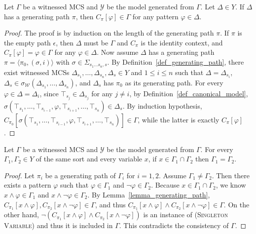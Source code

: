 \documentclass[acmsmall]{acmart}
\theoremstyle{acmdefinition}
\newcommand{\WW}{\mathcal{W}}
\newcommand{\YY}{\mathcal{Y}}
\newcommand{\sigmaW}{{\sigma_{\WW}}}
\newcommand{\prule}[1]{\textsc{(#1)}}
\newcommand{\singletonvariable}{\prule{Singleton Variable}\xspace}
\newcommand{\seq}[1]{\langle #1 \rangle} %
\newcommand{\ddd}{,\dots,}
\newcommand{\Cpi}{{C_\pi}}
\newcommand{\SigmaSub}[1]{\Sigma_{#1}}
\begin{document}
\begin{lemma}
\label{lemma_generating_path}
Let $\Gamma$ be a witnessed MCS and
$\YY$ be the model generated from $\Gamma$.
Let $\Delta \in Y$.
If $\Delta$ has a generating path $\pi$,
then
$\Cpi[\varphi] \in \Gamma$
for any pattern $\varphi \in \Delta$.
\end{lemma}
\begin{proof}
The proof is by induction on the length of the generating path $\pi$.
If $\pi$ is the empty path $\epsilon$, 
then $\Delta$ must be $\Gamma$ and $\Cpi$ is the identity 
context, and 
$\Cpi[\varphi] = \varphi \in \Gamma$ for any $\varphi \in \Delta$.
Now assume $\Delta$ has a generating path
$\pi = \seq{\pi_0 , (\sigma, i)}$
with $\sigma \in \SigmaSub{s_1 \dots s_n , s}$.
By Definition~\ref{def_generating_path}, there exist
witnessed MCSs
$\Delta_{s_1} \ddd \Delta_{s_n}, \Delta_s \in Y$
and $1 \le i \le n$ such that
$\Delta = \Delta_{s_i}$,
$\Delta_s \in \sigmaW(\Delta_{s_1} \ddd \Delta_{s_n})$,
and $\Delta_s$ has $\pi_0$ as its generating path.
For every $\varphi \in \Delta = \Delta_i$,
since $\top_{s_j} \in \Delta_{s_j}$ for any $j \neq i$,
by Definition~\ref{def_canonical_model},
$\sigma(\top_{s_1} \ddd \top_{s_{i-1}} , \varphi , 
\top_{s_{i+1}} \ddd \top_{s_n}) \in \Delta_s$.
By induction hypothesis, 
$C_{\pi_0}[
\sigma(\top_{s_1} \ddd \top_{s_{i-1}} , \varphi , 
\top_{s_{i+1}} \ddd \top_{s_n})] \in \Gamma$,
while the latter is exactly $\Cpi[\varphi]$.
\end{proof}

\begin{lemma}
\label{lemma_singleton_variable}
Let $\Gamma$ be a witnessed MCS and
$\YY$ be the model generated from $\Gamma$.
For every $\Gamma_1, \Gamma_2 \in Y$ of the same sort
and every variable $x$,
if $x \in \Gamma_1 \cap \Gamma_2$ then $\Gamma_1 = \Gamma_2$.
\end{lemma}
\begin{proof}
Let $\pi_i$ be a generating path of $\Gamma_i$
for $i = 1, 2$.
Assume $\Gamma_1 \neq \Gamma_2$.
Then there exists a pattern $\varphi$ such that
$\varphi \in \Gamma_1$ and $\neg \varphi \in \Gamma_2$.
Because $x \in \Gamma_1 \cap \Gamma_2$, 
we know 
$x \wedge \varphi \in \Gamma_1$ and 
$x \wedge \neg \varphi \in \Gamma_2$.
By Lemma~\ref{lemma_generating_path},
$C_{\pi_1}[x \wedge \varphi], 
 C_{\pi_2}[x \wedge \neg \varphi] \in {\Gamma}$,
and thus 
$C_{\pi_1}[x \wedge \varphi] \wedge
 C_{\pi_2}[x \wedge \neg \varphi]
 \in \Gamma$.
On the other hand, 
$\neg(
 C_{\pi_1}[x \wedge \varphi] \wedge
 C_{\pi_2}[x \wedge \neg \varphi]
 )
$
is an instance of \singletonvariable
and thus it is included in ${\Gamma}$.
This contradicts the consistency of ${\Gamma}$.
\end{proof}
\end{document}
